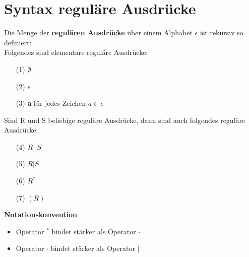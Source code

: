 \documentclass{scrreprt}
\begin{document}
\section{Syntax reguläre Ausdrücke}
Die Menge der \textbf{regulären Ausdrücke} über einem Alphabet $\epsilon$ ist rekursiv so definiert:
\\Folgendes sind elementare reguläre Ausdrücke:
\begin{itemize}
    \item [(1)] $\emptyset$
    \item [(2)] $\epsilon$
    \item [(3)] \textbf{a} für jedes Zeichen $a \in \epsilon$
\end{itemize}
Sind R und S beliebige reguläre Ausdrücke, dann sind auch folgendes reguläre Ausdrücke:
\begin{itemize}
    \item [(4)] $R \cdot S$
    \item [(5)] $R | S$
    \item [(6)] $R^{*}$
    \item [(7)] $(R)$
\end{itemize}
\textbf{Notationskonvention}
\begin{itemize}
    \item Operator $^{*}$ bindet stärker als Operator $\cdot$
    \item Operator $\cdot$ bindet stärker als Operator $|$
\end{itemize}
\end{document}
